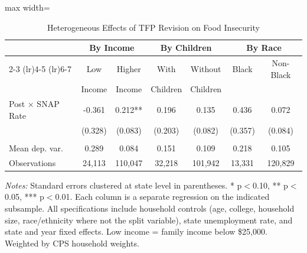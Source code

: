 \begin{table}[H]
\centering
\caption{Heterogeneous Effects of TFP Revision on Food Insecurity}
\label{tab:heterogeneity}
\begin{threeparttable}
\begin{adjustbox}{max width=\textwidth}
\begin{tabular}{lcccccc}
\toprule
& \multicolumn{2}{c}{By Income} & \multicolumn{2}{c}{By Children} & \multicolumn{2}{c}{By Race} \\
\cmidrule(lr){2-3} \cmidrule(lr){4-5} \cmidrule(lr){6-7}
& Low & Higher & With & Without & Black & Non-Black \\
& Income & Income & Children & Children & & \\
\midrule
Post $\times$ SNAP Rate & -0.361 & 0.212** & 0.196 & 0.135 & 0.436 & 0.072 \\
& (0.328) & (0.083) & (0.203) & (0.082) & (0.357) & (0.084) \\
\\
Mean dep. var. & 0.289 & 0.084 & 0.151 & 0.109 & 0.218 & 0.105 \\
Observations & 24,113 & 110,047 & 32,218 & 101,942 & 13,331 & 120,829 \\
\bottomrule
\end{tabular}
\end{adjustbox}
\begin{tablenotes}[flushleft]
\small
\item \textit{Notes:} Standard errors clustered at state level in parentheses. * p$<$0.10, ** p$<$0.05, *** p$<$0.01. Each column is a separate regression on the indicated subsample. All specifications include household controls (age, college, household size, race/ethnicity where not the split variable), state unemployment rate, and state and year fixed effects. Low income = family income below \$25,000. Weighted by CPS household weights.
\end{tablenotes}
\end{threeparttable}
\end{table}
